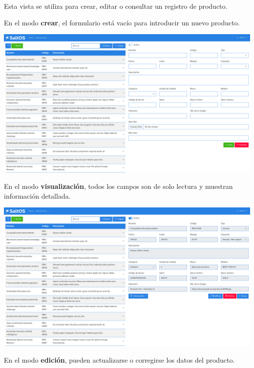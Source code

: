\documentclass[a4paper]{article}
\begin{document}
Esta vista se utiliza para crear, editar o consultar un registro de producto.

En el modo \textbf{crear}, el formulario está vacío para introducir un nuevo producto.

\begin{center}\includegraphics[width=1\textwidth]{../ujest/snaps/test-screenshots-js-screenshots-sales-products-create-es-es-1-snap.png}\end{center}

En el modo \textbf{visualización}, todos los campos son de solo lectura y muestran información detallada.

\begin{center}\includegraphics[width=1\textwidth]{../ujest/snaps/test-screenshots-js-screenshots-sales-products-view-100-es-es-1-snap.png}\end{center}

En el modo \textbf{edición}, pueden actualizarse o corregirse los datos del producto.
\end{document}
